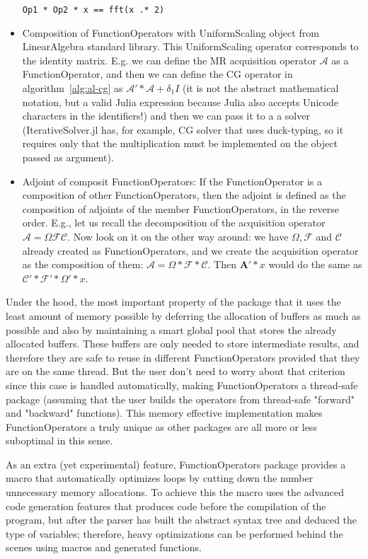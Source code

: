 \begin{itemize}
    \lstinline{Op1 * Op2 * x == fft(x .* 2)}
    \item Composition of FunctionOperators with UniformScaling object from LinearAlgebra standard library. This UniformScaling operator corresponds to the identity matrix. E.g. we can define the MR acquisition operator $\mathcal{A}$ as a FunctionOperator, and then we can define the CG operator in algorithm~\ref{alg:al-cg} as $\mathcal{A}' * \mathcal{A} + \delta_1 I$ (it is not the abstract mathematical notation, but a valid Julia expression because Julia also accepts Unicode characters in the identifiers!) and then we can pass it to a a solver (IterativeSolver.jl has, for example, CG solver that uses duck-typing, so it requires only that the multiplication must be implemented on the object passed as argument).
    \item Adjoint of composit FunctionOperators: If the FunctionOperator is a composition of other FunctionOperators, then the adjoint is defined as the composition of adjoints of the member FunctionOperators, in the reverse order. E.g., let us recall the decomposition of the acquisition operator $\mathcal{A} = \Omega \mathcal{FC}$. Now look on it on the other way around: we have $\Omega, \mathcal{F}$ and $\mathcal{C}$ already created as FunctionOperators, and we create the acquisition operator as the composition of them: $\mathcal{A} = \Omega * \mathcal{F * C}$. Then $\mathbf{A}' * x$ would do the same as $\mathcal{C' * F'} * \Omega' * x$.
\end{itemize}

Under the hood, the most important property of the package that it uses the least amount of memory possible by deferring the allocation of buffers as much as possible and also by maintaining a smart global pool that stores the already allocated buffers. These buffers are only needed to store intermediate results, and therefore they are safe to reuse in different FunctionOperators provided that they are on the same thread. But the user don't need to worry about that criterion since this case is handled automatically, making FunctionOperators a thread-safe package (assuming that the user builds the operators from thread-safe "forward" and "backward" functions). This memory effective implementation makes FunctionOperators a truly unique as other packages are all more or less suboptimal in this sense.

As an extra (yet experimental) feature, FunctionOperators package provides a macro that automatically optimizes loops by cutting down the number unnecessary memory allocations. To achieve this the macro uses the advanced code generation features that produces code before the compilation of the program, but after the parser has built the abstract syntax tree and deduced the type of variables; therefore, heavy optimizations can be performed behind the scenes using macros and generated functions. %

